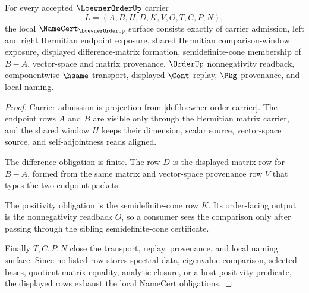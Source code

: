 \begin{theorem}
\label{thm:loewner-order-namecert-obligations}
For every accepted $\LoewnerOrderUp$ carrier
$$
L=(A,B,H,D,K,V,O,T,C,P,N),
$$
the local $\NameCert_{\LoewnerOrderUp}$ surface consists exactly of carrier admission, left and right Hermitian endpoint exposure, shared Hermitian comparison-window exposure, displayed difference-matrix formation, semidefinite-cone membership of $B-A$, vector-space and matrix provenance, $\OrderUp$ nonnegativity readback, componentwise $\hsame$ transport, displayed $\Cont$ replay, $\Pkg$ provenance, and local naming.
\end{theorem}
\begin{proof}
Carrier admission is projection from \autoref{def:loewner-order-carrier}. The endpoint rows $A$ and $B$ are visible only through the Hermitian matrix carrier, and the shared window $H$ keeps their dimension, scalar source, vector-space source, and self-adjointness reads aligned.

The difference obligation is finite. The row $D$ is the displayed matrix row for $B-A$, formed from the same matrix and vector-space provenance row $V$ that types the two endpoint packets.

The positivity obligation is the semidefinite-cone row $K$. Its order-facing output is the nonnegativity readback $O$, so a consumer sees the comparison only after passing through the sibling semidefinite-cone certificate.

Finally $T,C,P,N$ close the transport, replay, provenance, and local naming surface. Since no listed row stores spectral data, eigenvalue comparison, selected bases, quotient matrix equality, analytic closure, or a host positivity predicate, the displayed rows exhaust the local NameCert obligations.
\end{proof}

